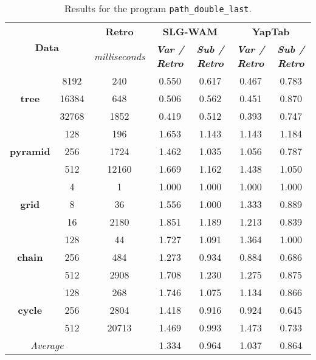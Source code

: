 \begin{table}[ht]
\centering
\footnotesize{
  \begin{tabular}{cc|c|cc|cc}
   \hline
    \hline
    \multicolumn{2}{c|}{\multirow{2}{*}{\small{\textbf{Data}}}} & \textbf{\small{Retro}} & \multicolumn{2}{c|}{\small{\textbf{SLG-WAM}}} & \multicolumn{2}{c}{\small{\textbf{YapTab}}} \\
     \multicolumn{2}{c|}{} & \scriptsize{\textit{milliseconds}} & \textbf{\textit{\scriptsize{Var / Retro}}} & \textbf{\textit{\scriptsize{Sub / Retro}}} & \textbf{\textit{\scriptsize{Var / Retro}}} & \textbf{\textit{\scriptsize{Sub / Retro}}} \\
   \hline
   \hline

\multirow{3}{*}{\textbf{tree}} &  8192 &  240 &  0.550  &  0.617  &  0.467 & 0.783 \\
&  16384 &  648 &  0.506  &  0.562  &  0.451 & 0.870 \\
&  32768 &  1852 &  0.419  &  0.512  &  0.393 & 0.747 \\
\hline
\multirow{3}{*}{\textbf{pyramid}} &  128 &  196 &  1.653  &  1.143  &  1.143 & 1.184 \\
&  256 &  1724 &  1.462  &  1.035  &  1.056 & 0.787 \\
&  512 &  12160 &  1.669  &  1.162  &  1.438 & 1.050 \\
\hline
\multirow{3}{*}{\textbf{grid}} &  4 &  1 &  1.000  &  1.000  &  1.000 & 1.000 \\
&  8 &  36 &  1.556  &  1.000  &  1.333 & 0.889 \\
&  16 &  2180 &  1.851  &  1.189  &  1.213 & 0.839 \\
\hline
\multirow{3}{*}{\textbf{chain}} &  128 &  44 &  1.727  &  1.091  &  1.364 & 1.000 \\
&  256 &  484 &  1.273  &  0.934  &  0.884 & 0.686 \\
&  512 &  2908 &  1.708  &  1.230  &  1.275 & 0.875 \\
\hline
\multirow{3}{*}{\textbf{cycle}} &  128 &  268 &  1.746  &  1.075  &  1.134 & 0.866 \\
&  256 &  2804 &  1.418  &  0.916  &  0.924 & 0.645 \\
&  512 &  20713 &  1.469  &  0.993  &  1.473 & 0.733 \\
\hline
\hline
\multicolumn{2}{c}{\textit{Average}} & & 1.334 & 0.964 & 1.037 & 0.864 \\ 
\hline
\hline
\end{tabular}
}
\caption{Results for the program \texttt{path\_double\_last}.}
\label{tbl:prefix_path_double_last}
\end{table}

